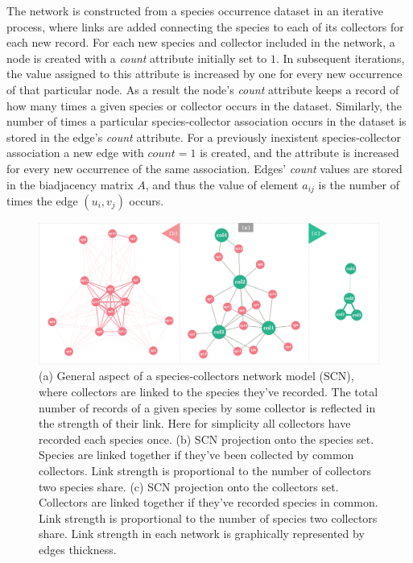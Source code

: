 The network is constructed from a species occurrence dataset in an iterative process, where links are added connecting the species to each of its collectors for each new record. 
For each new species and collector included in the network, a node is created with a \textit{count} attribute initially set to $1$. In subsequent iterations, the value assigned to this attribute is increased by one for every new occurrence of that particular node. As a result the node's \textit{count} attribute keeps a record of how many times a given species or collector occurs in the dataset.
Similarly, the number of times a particular species-collector association occurs in the dataset is stored in the edge's \textit{count} attribute.
For a previously inexistent species-collector association a new edge with $count=1$ is created, and the attribute is increased for every new occurrence of the same association.
Edges' \textit{count} values are stored in the biadjacency matrix $A$, and thus the value of element $a_{ij}$ is the number of times the edge $(u_i, v_j)$ occurs.


  \begin{figure}[h!]
  	\centering
    \includegraphics[width=\linewidth]{figures/scn_generalaspect.png}
    \caption{(a) General aspect of a species-collectors network model (SCN), where collectors are linked to the species they've recorded. The total number of records of a given species by some collector is reflected in the strength of their link. Here for simplicity all collectors have recorded each species once. (b) SCN projection onto the species set. Species are linked together if they've been collected by common collectors. Link strength is proportional to the number of collectors two species share. (c) SCN projection onto the collectors set. Collectors are linked together if they've recorded species in common. Link strength is proportional to the number of species two collectors share. Link strength in each network is graphically represented by edges thickness.}
    \label{fig:scn_general}
  \end{figure}

